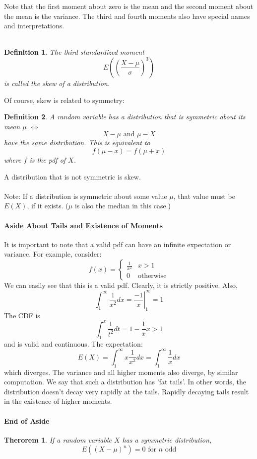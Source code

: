 \documentclass[12pt]{article} %
\newtheorem{defn}{Definition}
\newtheorem{thm}{Therorem}
\begin{document}
Note that the first moment about zero is the mean and the second moment about the mean is the variance. The third and fourth moments also have special names and interpretations.\\\\
\begin{defn}
The third standardized moment 
$$E\left(\left(\frac{X-\mu}{\sigma}\right)^3\right)$$
is called the \emph{skew} of a distribution.
\end{defn}
Of course, skew is related to symmetry:
\begin{defn}
A random variable has a distribution that is symmetric about its mean $\mu$ $\iff$
$$X-\mu \textrm{ and } \mu-X$$
have the same distribution. This is equivalent to 
$$f(\mu-x) = f(\mu+x)$$
where $f$ is the pdf of $X$.
\end{defn}
A distribution that is not symmetric is skew.\\\\
Note: If a distribution is symmetric about some value $\mu$, that value must be $E(X)$, if it exists. ($\mu$ is also the median in this case.)
\paragraph{Aside About Tails and Existence of Moments}
It is important to note that a valid pdf can have an infinite expectation or variance. For example, consider:
$$f(x) =\left\{\begin{matrix}\frac{1}{x^2} & x>1\\0&\textrm{otherwise}\end{matrix}\right.$$
We can easily see that this is a valid pdf. Clearly, it is strictly positive. 
Also,
$$\int_1^\infty \frac{1}{x^2}dx = \left.\frac{-1}{x}\right\rvert_1^\infty = 1$$
The CDF is
$$\int_1^x \frac1{t^2}dt = 1-\frac1{x} x>1$$
and is valid and continuous. The expectation:
$$E(X) = \int_1^\infty x \frac1{x^2}dx = \int_1^\infty \frac1{x}dx$$
which diverges. The variance and all higher moments also diverge, by similar computation. We say that such a distribution has 'fat tails'. In other words, the distribution doesn't decay very rapidly at the tails. Rapidly decaying tails result in the existence of higher moments.
\paragraph{End of Aside}


\begin{thm}
If a random variable $X$ has a symmetric distribution,
$$E(\left(X-\mu\right)^n) = 0 \textrm{ for } n \textrm{ odd}$$
\end{thm}
\end{document}
